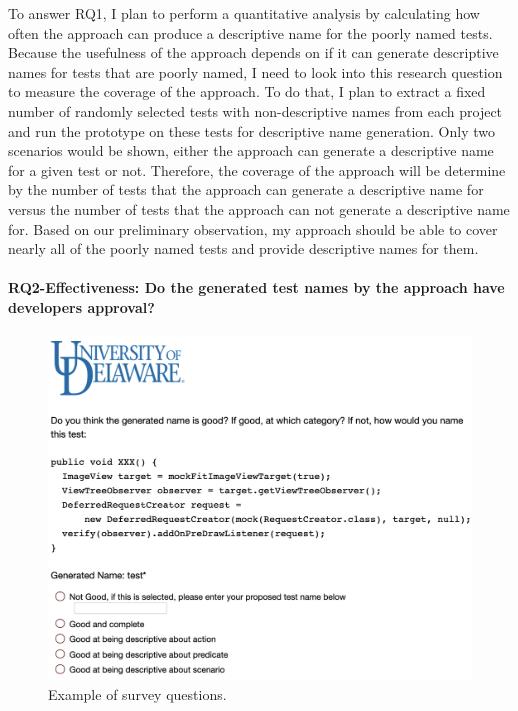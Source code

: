 To answer RQ1, I plan to perform a quantitative analysis by calculating how often the approach can produce a descriptive name for the poorly named tests.
%
Because the usefulness of the approach depends on if it can generate descriptive names for tests that are poorly named, I need to look into this research question to measure the coverage of the approach.
%
To do that, I plan to extract a fixed number of randomly selected tests with non-descriptive names from each project and run the prototype on these tests for descriptive name generation.
%
Only two scenarios would be shown, either the approach can generate a descriptive name for a given test or not.
%
Therefore, the coverage of the approach will be determine by the number of tests that the approach can generate a descriptive name for versus the number of tests that the approach can not generate a descriptive name for.
%
Based on our preliminary observation, my approach should be able to cover nearly all of the poorly named tests and provide descriptive names for them.


\paragraph{RQ2-Effectiveness: Do the generated test names by the approach have developers approval?}

\begin{figure}[t]
    \centering
    \includegraphics[scale=0.35]{figures/survey.png}
    \caption{Example of survey questions.}
    \label{fig:survey}
\end{figure}


